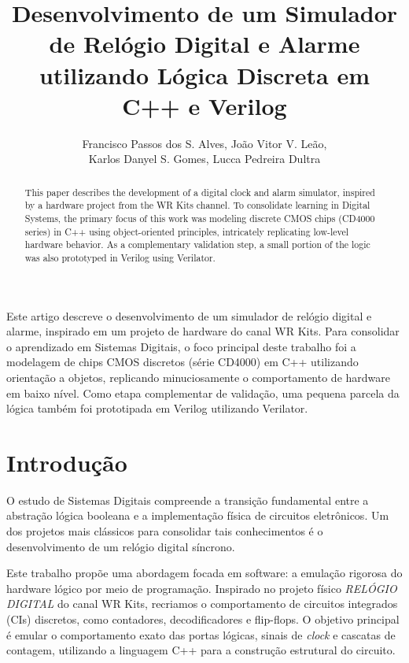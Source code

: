 \documentclass[12pt]{article}
\title{Desenvolvimento de um Simulador de Relógio Digital e Alarme\\ utilizando Lógica Discreta em C++ e Verilog}
\author{Francisco Passos dos S. Alves\inst{1}, João Vitor V. Leão\inst{1}, \\ Karlos Danyel S. Gomes\inst{1}, Lucca Pedreira Dultra\inst{1}}
\begin{document}
 

\maketitle

\begin{abstract}
  This paper describes the development of a digital clock and alarm simulator, inspired by a hardware project from the WR Kits channel. To consolidate learning in Digital Systems, the primary focus of this work was modeling discrete CMOS chips (CD4000 series) in C++ using object-oriented principles, intricately replicating low-level hardware behavior. As a complementary validation step, a small portion of the logic was also prototyped in Verilog using Verilator.
\end{abstract}
     
\begin{resumo} 
  Este artigo descreve o desenvolvimento de um simulador de relógio digital e alarme, inspirado em um projeto de hardware do canal WR Kits. Para consolidar o aprendizado em Sistemas Digitais, o foco principal deste trabalho foi a modelagem de chips CMOS discretos (série CD4000) em C++ utilizando orientação a objetos, replicando minuciosamente o comportamento de hardware em baixo nível. Como etapa complementar de validação, uma pequena parcela da lógica também foi prototipada em Verilog utilizando Verilator.
\end{resumo}

\section{Introdução}

O estudo de Sistemas Digitais compreende a transição fundamental entre a abstração lógica booleana e a implementação física de circuitos eletrônicos. Um dos projetos mais clássicos para consolidar tais conhecimentos é o desenvolvimento de um relógio digital síncrono. 

Este trabalho propõe uma abordagem focada em software: a emulação rigorosa do hardware lógico por meio de programação. Inspirado no projeto físico \textit{RELÓGIO DIGITAL} do canal WR Kits, recriamos o comportamento de circuitos integrados (CIs) discretos, como contadores, decodificadores e flip-flops. O objetivo principal é emular o comportamento exato das portas lógicas, sinais de \textit{clock} e cascatas de contagem, utilizando a linguagem C++ para a construção estrutural do circuito. 
\end{document}
